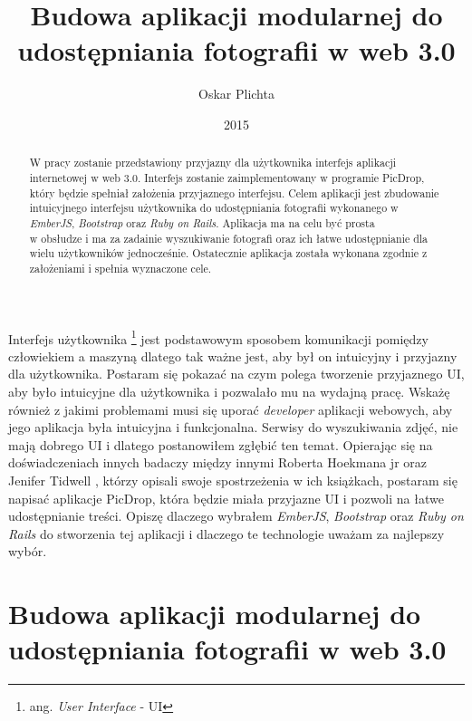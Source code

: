 \documentclass[brudnopis]{xmgr}
\author   {Oskar Plichta}
\title    {Budowa aplikacji modularnej do udostępniania fotografii  w web 3.0}
\date     {2015}
\begin{document}
\begin{abstract}

W pracy zostanie przedstawiony przyjazny dla użytkownika interfejs aplikacji internetowej w web 3.0. Interfejs zostanie zaimplementowany w programie PicDrop,  który będzie spełniał założenia przyjaznego interfejsu. Celem aplikacji jest zbudowanie intuicyjnego interfejsu użytkownika do udostępniania fotografii wykonanego w \textit{EmberJS}, \textit{Bootstrap} oraz \textit{Ruby on Rails}. Aplikacja ma na celu być prosta \\ w obsłudze i ma za zadainie wyszukiwanie fotografi oraz ich łatwe udostępnianie dla wielu użytkowników jednocześnie. Ostatecznie aplikacja została wykonana zgodnie z założeniami i spełnia wyznaczone cele.

\end{abstract}

\maketitle
%
\introduction
Interfejs użytkownika \footnote{ang. \textit{User Interface} - UI}  jest podstawowym sposobem komunikacji pomiędzy człowiekiem a maszyną dlatego tak ważne jest, aby był on intuicyjny i przyjazny dla użytkownika. 
Postaram się pokazać na czym polega tworzenie przyjaznego UI, aby było intuicyjne dla użytkownika i pozwalało mu na wydajną pracę. Wskażę również z jakimi problemami musi się uporać \textit{developer} aplikacji webowych, aby jego aplikacja była intuicyjna i funkcjonalna. Serwisy do wyszukiwania zdjęć, nie mają dobrego UI i dlatego postanowiłem zgłębić ten temat. Opierając się na  doświadczeniach innych badaczy  między innymi Roberta Hoekmana jr  \cite {magiaUI} oraz Jenifer Tidwell  \cite {projektowanieUI}, którzy opisali swoje spostrzeżenia w ich książkach, postaram się napisać aplikacje PicDrop, która  będzie miała przyjazne UI i pozwoli na łatwe udostępnianie treści. Opiszę dlaczego wybrałem \textit{EmberJS}, \textit{Bootstrap} oraz \textit{Ruby on Rails} do stworzenia tej aplikacji i dlaczego te technologie uważam za najlepszy wybór.


\chapter{Budowa aplikacji modularnej do udostępniania fotografii  w web 3.0}
\end{document}
